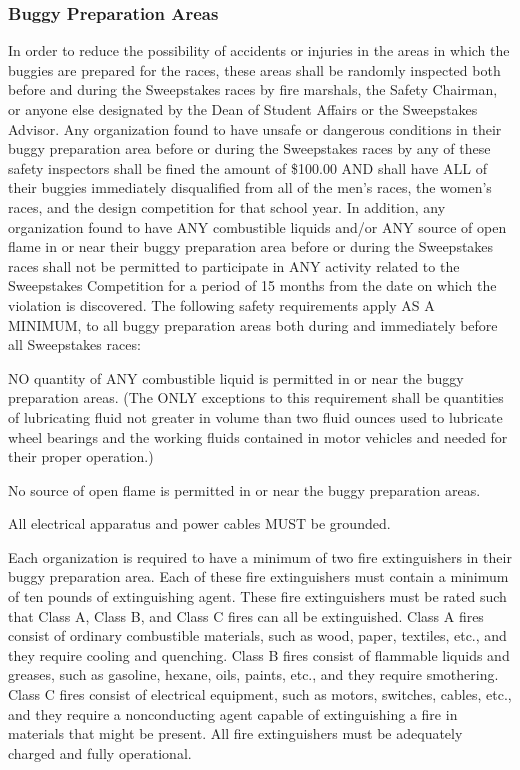 \subsubsection{Buggy Preparation Areas}

	In order to reduce the possibility of accidents or injuries in the areas in
	which the buggies are prepared for the races, these areas shall be randomly
	inspected both before and during the Sweepstakes races by fire marshals, the
	Safety Chairman, or anyone else designated by the Dean of Student Affairs or
	the Sweepstakes Advisor. Any organization found to have unsafe or dangerous
	conditions in their buggy preparation area before or during the Sweepstakes
	races by any of these safety inspectors shall be fined the amount of \$100.00
	AND shall have ALL of their buggies immediately disqualified from all of the
	men's races, the women's races, and the design competition for that school
	year. In addition, any organization found to have ANY combustible liquids
	and/or ANY source of open flame in or near their buggy preparation area before
	or during the Sweepstakes races shall not be permitted to participate in ANY
	activity related to the Sweepstakes Competition for a period of 15 months from
	the date on which the violation is discovered. The following safety
	requirements apply AS A MINIMUM, to all buggy preparation areas both during and
	immediately before all Sweepstakes races:

	NO quantity of ANY combustible liquid is permitted in or near the buggy
	preparation areas. (The ONLY exceptions to this requirement shall be quantities
	of lubricating fluid not greater in volume than two fluid ounces used to
	lubricate wheel bearings and the working fluids contained in motor vehicles and
	needed for their proper operation.)

	No source of open flame is permitted in or near the buggy preparation areas.

	All electrical apparatus and power cables MUST be grounded.

	Each organization is required to have a minimum of two fire extinguishers in
	their buggy preparation area. Each of these fire extinguishers must contain a
	minimum of ten pounds of extinguishing agent. These fire extinguishers must be
	rated such that Class A, Class B, and Class C fires can all be extinguished.
	Class A fires consist of ordinary combustible materials, such as wood, paper,
	textiles, etc., and they require cooling and quenching. Class B fires consist
	of flammable liquids and greases, such as gasoline, hexane, oils, paints, etc.,
	and they require smothering. Class C fires consist of electrical equipment,
	such as motors, switches, cables, etc., and they require a nonconducting agent
	capable of extinguishing a fire in materials that might be present. All fire
	extinguishers must be adequately charged and fully operational.

